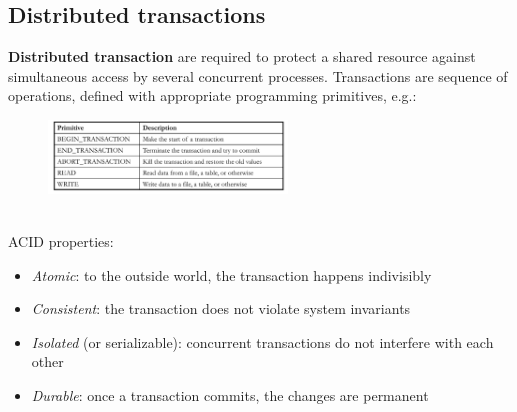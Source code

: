 \documentclass[10pt,a4paper]{article}
\begin{document}
\subsection{Distributed transactions}
\textbf{Distributed transaction} are required to protect a shared resource against simultaneous access by several concurrent processes. Transactions are sequence of operations, defined with appropriate programming primitives, e.g.: 
\begin{figure}[h!]
 \hfill \includegraphics[width=180pt]{images/dis-tra.png}\hspace*{\fill}
  \label{fig:dis-tra}
\end{figure} \\
ACID properties:
\begin{itemize}
	\item \textit{Atomic}: to the outside world, the transaction happens indivisibly
	\item \textit{Consistent}: the transaction does not violate system invariants
	\item \textit{Isolated} (or serializable): concurrent transactions do not interfere with each other 
	\item \textit{Durable}: once a transaction commits, the changes are permanent
\end{itemize}
\end{document}
